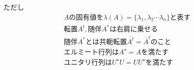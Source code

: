 \documentclass{ltjsarticle}
\begin{document}


ただし
\begin{gather}%
    Aの固有値を\lambda(A) = \{\lambda_1,\lambda_2 \cdots \lambda_n\} と表す\\
    転置A^t,随伴 A^{\ast}は右肩に乗せる\\
    随伴A^{\ast}とは共軛転置\overline{A^t}=\overline{A}^tのこと\\
    エルミート行列 は A^{\star}=A           を満たす\\
    ユニタリ行列   は U^{\star}U=UU^{\star} を満たす\\
\end{gather}
\end{document}
